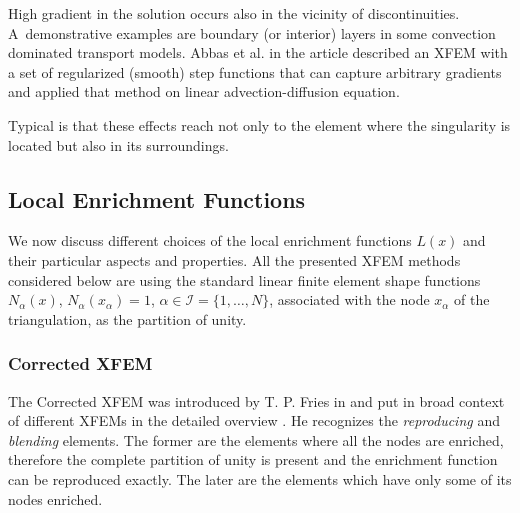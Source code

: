 High gradient in the solution occurs also in the vicinity of discontinuities. A~demonstrative examples are boundary (or interior) layers
in some convection dominated transport models. Abbas et al. in the article \cite{abbas_alizada_fries_highgradient_2010} described an XFEM with
a set of regularized (smooth) step functions that can capture arbitrary gradients and applied that method on linear advection-diffusion equation.

Typical is that these effects reach not only to the element where the singularity is located but also in its surroundings.





 
\subsection{Local Enrichment Functions}
We now discuss different choices of the local enrichment functions $L(x)$ and their particular aspects and properties.
All the presented XFEM methods considered below are using the standard linear finite element shape 
functions $N_\alpha(x)$, $N_\alpha(x_\alpha)=1$, $\alpha\in\mathcal{I}=\{1,\ldots,N\}$, associated with the node $x_\alpha$ of the triangulation,
as the partition of unity.

\subsubsection{Corrected XFEM}
The Corrected XFEM was introduced by T. P. Fries in \cite{fries_corrected_2008} and put in broad context of different XFEMs in the detailed overview \cite{fries_xfem_overview_2010}.
He recognizes the \emph{reproducing} and \emph{blending} elements.
The former are the elements where all the nodes are enriched, therefore the complete partition of unity is present
and the enrichment function can be reproduced exactly. The later are the elements which have only some of its nodes enriched.

